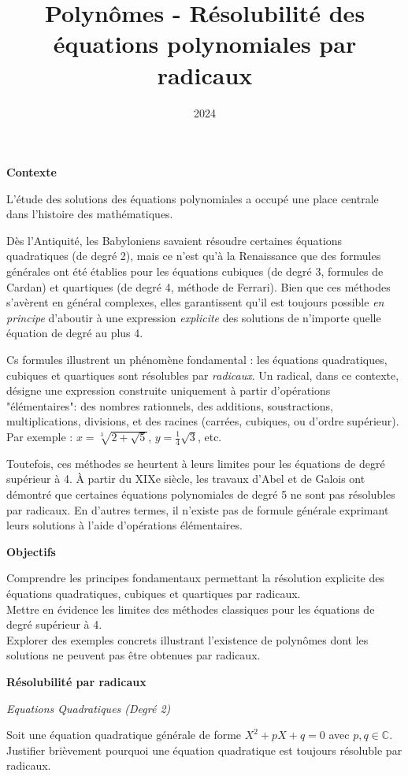 \documentclass[10pt,a4paper]{article}
\title{Polynômes - Résolubilité des équations polynomiales par radicaux}
\author{}
\date{2024}
\begin{document}
\textbf{Contexte}

L'étude des solutions des équations polynomiales a occupé une place centrale dans l'histoire des
mathématiques.

Dès l'Antiquité, les Babyloniens savaient résoudre certaines équations quadratiques (de degré 2),
mais ce n'est qu'à la Renaissance que des formules générales ont été établies pour les équations
cubiques (de degré 3, formules de Cardan) et quartiques (de degré 4, méthode de Ferrari). Bien que
ces méthodes s'avèrent en général complexes, elles garantissent qu'il est toujours possible
\textit{en principe} d'aboutir à une expression \textit{explicite} des solutions de n'importe quelle
équation de degré au plus 4.

Cs formules illustrent un phénomène fondamental : les équations quadratiques, cubiques et quartiques
sont résolubles par \textit{radicaux}. Un radical, dans ce contexte, désigne une expression
construite uniquement à partir d'opérations "élémentaires": des nombres rationnels, des additions,
soustractions, multiplications, divisions, et des racines (carrées, cubiques, ou d'ordre supérieur).
Par exemple : \( x = \sqrt[3]{2 + \sqrt{5}} \), \( y = \frac{1}{4}\sqrt{3} \), etc.

Toutefois, ces méthodes se heurtent à leurs limites pour les équations de degré supérieur à 4. À
partir du XIXe siècle, les travaux d'Abel et de Galois ont démontré que certaines équations
polynomiales de degré 5 ne sont pas résolubles par radicaux. En d'autres termes, il n'existe pas de
formule générale exprimant leurs solutions à l'aide d'opérations élémentaires.

\bigskip
\textbf{Objectifs}

Comprendre les principes fondamentaux permettant la résolution explicite des équations quadratiques,
cubiques et quartiques par radicaux. \\
Mettre en évidence les limites des méthodes classiques pour les équations de degré supérieur à 4. \\
Explorer des exemples concrets illustrant l'existence de polynômes dont les solutions ne peuvent pas
être obtenues par radicaux.

\bigskip
\textbf{Résolubilité par radicaux}

\bigskip
\textit{Equations Quadratiques (Degré 2)}

\q Soit une équation quadratique générale de forme \( X^2 + pX + q = 0 \) avec \( p, q \in \mathbb{C} \).
Justifier brièvement pourquoi une équation quadratique est toujours résoluble par radicaux.
\end{document}
